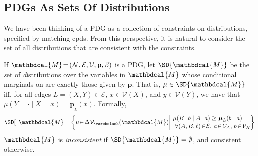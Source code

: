 \documentclass{article}
\theoremstyle{plain}
\theoremstyle{definition}
\theoremstyle{remark}
\newcommand\mat[1]{\mathbf{#1}}
\newcommand{\notation}[2][]{#1}
\renewcommand{\notation}[2][]{{\color{notationcolor} #2}}
\newcommand{\none}{\varobslash}
\def\sheq{\!=\!}
\newcommand{\bp}[1][L]{\mat{p}_{\!_{#1}\!}}
\newcommand{\V}{\mathcal V}
\newcommand{\N}{\mathcal N}
\newcommand{\Ed}{\mathcal E}
\newcommand{\pdgvars}[1][]{(\N#1, \Ed#1, \V#1, \mat p#1, \beta#1)}
\newcommand{\dg}[1]{\mathbdcal{#1}}
\numberwithin{equation}{section}
\begin{document}
\subsection{PDGs As Sets Of Distributions}\label{sec:set-of-distribution-semantics} 
We have been thinking of a PDG as a collection of constraints on distributions, specified by matching cpds. From this perspective, 
it is natural to consider
the set of all distributions that are consistent with the constraints.

\begin{defn} \label{def:set-semantics} 
If $\dg M\sheq\pdgvars[]$ is a PDG, let $\SD{\dg M}$ be the \emph{s}et of \emph{d}istributions over the variables in $\dg M$ 
whose conditional marginals on are exactly those given by $\mat p$.
That is, $\mu \in \SD{\dg M}$ iff, for all edges $L = (X,Y) \in \Ed$,  $x \in \V(X)$,  and $y \in \V(Y)$, we have that $\mu(Y = \cdot \mid X\sheq x) = \bp(x)$.
\notation{Formally,		
        \[ \SD[\Big]\dg M = \!\left\{\mu \!\in\! \Delta \V_\none (\dg M) \middle|\!
        \begin{array}{l}
        \mu(B\!\! =\!\!b \mid A\!\!=\!\!a) \geq \boldsymbol\mu_L(b \mid a) \\[0.1em]
        ~\text{$\forall (A, B,\ell) \!\in\! \Ed$, $a \!\in\!\mathcal V_A$, $b \!\in\! \mathcal V_B$} \end{array}\!\!\! \right\}\]
    }
$\dg M$ is \emph{inconsistent} if $\SD{\dg M} = \emptyset$, and consistent otherwise.
\end{defn}
\end{document}
